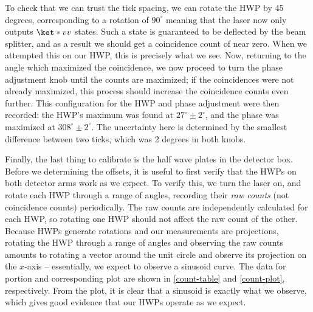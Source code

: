 \documentclass[10pt]{article}
\begin{document}
	To check that we can trust the tick spacing, we can rotate the HWP by 45 degrees, corresponding to a
	rotation of \( 90^{\circ} \) meaning that the laser now only outputs \( \ket*{vv} \) states. Such a state
	is guaranteed to be deflected by the beam splitter, and as a result we should get a coincidence count of
	near zero. When we attempted this on our HWP, this is precisely what we see.    
	Now, returning to the angle which maximized the coincidence, we now proceed to turn the phase adjustment
	knob until the counts are maximized; if the coincidences were not already maximized, this process should
	increase the coincidence counts even further. This configuration for the HWP and phase adjustment were
	then recorded: the HWP's maximum was found at \( 27^{\circ} \pm 2^{\circ} \), and the phase was maximized at
	\( 308^{\circ} \pm 2^{\circ} \). The uncertainty here is determined by the smallest difference between
	two ticks, which was 2 degrees in both knobs.  

	Finally, the last thing to calibrate is the half wave plates in the detector box. Before we determining
	the offsets, it is useful to first verify that the HWPs on both detector arms work as we expect. To
	verify this, we turn the laser on, and rotate each HWP through a range of angles, recording their
	\textit{raw counts} (not coincidence counts) periodically. The raw counts are independently calculated
	for each HWP, so rotating one HWP should not affect the raw count of the other. 
	Because HWPs generate rotations and our measurements are projections, rotating the HWP through a range of
	angles and observing the raw counts amounts to rotating a vector around the unit circle and observe its
	projection on the \( x \)-axis -- essentially, we expect to observe a sinusoid curve. The data for 
	portion and corresponding plot are shown in \ref{count-table} and \ref{count-plot}, respectively. 
	From the plot, it is clear
	that a sinusoid is exactly what we observe, which gives good evidence that our HWPs operate as we expect.    
\end{document}
